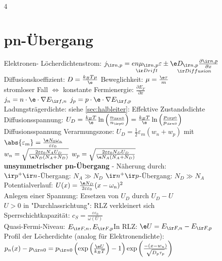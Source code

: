 \documentclass[fs, footer]{latex4ei_custom}
\begin{document}
\begin{multicols*}{4}
	\section{pn-Übergang}
	Elektronen- Löcherdichtenstrom: $j_{\ir n,p} = \underset{\ir Drift}{en\mu_{\ir n,p}\varepsilon} \pm \underset{\ir Diffusion}{\e D_{\ir n,p} \frac{\partial {\ir n,p}}{\partial x}}$\\
	Diffusionskoeffizient: $D = \frac{k_BT\mu}{\e}$ \qquad Beweglichkeit: $\mu=\frac{\e\tau}{m}$\\
	stromloser Fall $\Leftrightarrow$ konstante Fermienergie: $\frac{\partial E_F}{\partial x}$\\
	$j_n = n\cdot\e\cdot\nabla E_{\ir f,n}$ \qquad $j_p = p\cdot\e\cdot\nabla E_{\ir f,p}$\\
	Ladungsträgerdichte: siehe \ref{sec:halbleiter}: Effektive Zustandsdichte\\
	Diffusionsspannung: $U_D = \frac{k_BT}{\e}\ln\left(\frac{n_{\ir n0}}{n_{\ir p0}}\right)=\frac{k_BT}{\e}\ln\left(\frac{p_{\ir p0}}{p_{\ir n0}}\right)$\\
	Diffusionsspannung Verarmungszone: $U_D = \frac{1}{2}\varepsilon_m(w_n + w_p)$ mit $\abs{\varepsilon_m} = \frac{\e N_0\omega_n}{\varepsilon\varepsilon_0}$\\
	$w_n = \sqrt{\frac{2\varepsilon\varepsilon_0N_AU_D}{\e N_D(N_A+N_D)}}$ \qquad $w_p = \sqrt{\frac{2\varepsilon\varepsilon_0N_DU_D}{\e N_A(N_A+N_D)}}$\\
	\textbf{unsymmetrischer pn-Übergang} - Näherung durch:\\
	$\ir p^+\ir n$-Übergang: $N_A \gg N_D$ \qquad $\ir n^+\ir p$-Übergang: $N_D \gg N_A$\\
	Potentialverlauf: $U(x) = \frac{\e N_D}{2\varepsilon\varepsilon_0}(x-\omega_n)^2$\\
	Anlegen einer Spannung: Ersetzen von $U_D$ durch $U_D-U$\\
	$U > 0$ in "Durchlassrichtung": RLZ verkleinert sich\\
	Sperrschichtkapazität: $c_S = \frac{\varepsilon\varepsilon_0}{\omega(U)}$\\
	Quasi-Fermi-Niveau: $E_{\ir F,n}, E_{\ir F,p}$\qquad In RLZ: $\e U = E_{\ir F,n} - E_{\ir F,p}$\\
	Profil der Löcherdichte (analog für Elektronendichte):\\ $p_n(x) - p_{\ir n0} = p_{\ir n0}\left(\exp\left(\frac{\e U}{k_BT}\right)-1\right)\exp\left(\frac{-(x-w_n)}{\sqrt{D_p\tau_p}}\right)$\\

\end{multicols*}
\end{document}

